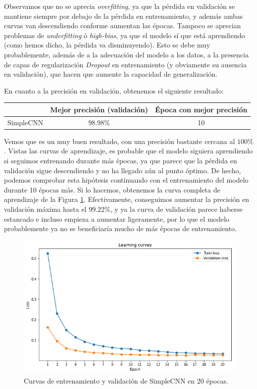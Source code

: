 \documentclass[11pt]{article}
\begin{document}
Observamos que no se aprecia \textit{overfitting}, ya que la pérdida en validación se mantiene siempre por debajo de la pérdida en entrenamiento, y además ambas curvas van descendiendo conforme aumentan las épocas. Tampoco se aprecian problemas de \textit{underfitting} ó \textit{high-bias}, ya que el modelo sí que está aprendiendo (como hemos dicho, la pérdida va disminuyendo). Esto se debe muy probablemente, además de a la adecuación del modelo a los datos, a la presencia de capas de regularización \textit{Dropout} en entrenamiento (y obviamente su ausencia en validación), que hacen que aumente la capacidad de generalización.

En cuanto a la precisión en validación, obtenemos el siguiente resultado:

\begin{table}[h!]
  \centering
  \begin{tabular}{c|cc}
    & Mejor precisión (validación) & Época con mejor precisión\\
    \hline
    SimpleCNN & $98.98\%$ & 10
  \end{tabular}
\end{table}

Vemos que es un muy buen resultado, con una precisión bastante cercana al $100\%$. Vistas las curvas de aprendizaje, es probable que el modelo siguiera aprendiendo si seguimos entrenando durante más épocas, ya que parece que la pérdida en validación sigue descendiendo y no ha llegado aún al punto óptimo. De hecho, podemos comprobar esta hipótesis continuando con el entrenamiento del modelo durante 10 épocas más. Si lo hacemos, obtenemos la curva completa de aprendizaje de la Figura \ref{fig:1_lc_full}. Efectivamente, conseguimos aumentar la precisión en validación máxima hasta el $99.22\%$, y ya la curva de validación parece haberse estancado e incluso empieza a aumentar ligeramente, por lo que el modelo probablemente ya no se beneficiaría mucho de más épocas de entrenamiento.

\begin{figure}[h!]
  \centering
  \includegraphics[width=.7\textwidth]{img/1_learning_curves_full}
    \caption{Curvas de entrenamiento y validación de SimpleCNN en 20 épocas.}
    \label{fig:1_lc_full}
\end{figure}
\end{document}

